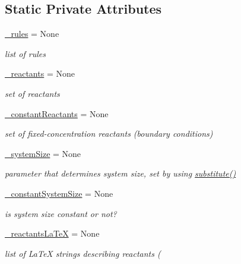 \subsection*{Static Private Attributes}
\begin{DoxyCompactItemize}
\item 
\hyperlink{class_mu_mo_t_1_1_mu_mo_t_1_1_mu_mo_tmodel_a3bffcba47fea374758cdf6e1abc66b6a}{\+\_\+rules} = None
\begin{DoxyCompactList}\small\item\em list of rules \end{DoxyCompactList}\item 
\hyperlink{class_mu_mo_t_1_1_mu_mo_t_1_1_mu_mo_tmodel_ab78b4926218dd610cd20b0fd9816f96b}{\+\_\+reactants} = None
\begin{DoxyCompactList}\small\item\em set of reactants \end{DoxyCompactList}\item 
\hyperlink{class_mu_mo_t_1_1_mu_mo_t_1_1_mu_mo_tmodel_a1aa86325ba55af1dd7e22124081a30f3}{\+\_\+constant\+Reactants} = None
\begin{DoxyCompactList}\small\item\em set of fixed-\/concentration reactants (boundary conditions) \end{DoxyCompactList}\item 
\hyperlink{class_mu_mo_t_1_1_mu_mo_t_1_1_mu_mo_tmodel_afaae7e86425ed04f1e39b4bb8039b1b4}{\+\_\+system\+Size} = None
\begin{DoxyCompactList}\small\item\em parameter that determines system size, set by using \hyperlink{class_mu_mo_t_1_1_mu_mo_t_1_1_mu_mo_tmodel_a2eec4a3b8deda7c717c06ed89c24d570}{substitute()} \end{DoxyCompactList}\item 
\hyperlink{class_mu_mo_t_1_1_mu_mo_t_1_1_mu_mo_tmodel_a283d55739d3410d93094fb529670e0cb}{\+\_\+constant\+System\+Size} = None
\begin{DoxyCompactList}\small\item\em is system size constant or not? \end{DoxyCompactList}\item 
\hyperlink{class_mu_mo_t_1_1_mu_mo_t_1_1_mu_mo_tmodel_accfd4bbcd94ec3ce4a064fec53921700}{\+\_\+reactants\+La\+TeX} = None
\begin{DoxyCompactList}\small\item\em list of La\+TeX strings describing reactants ( \end{DoxyCompactList}\item 

\end{DoxyCompactItemize}
